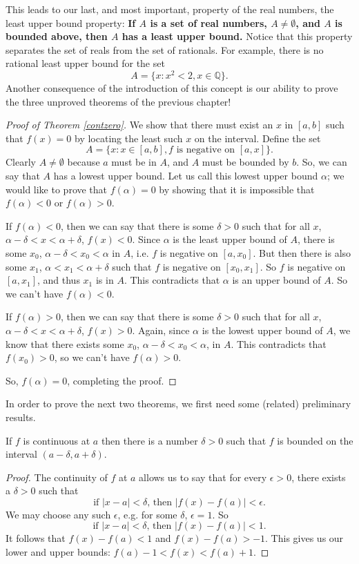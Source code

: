This leads to our last, and most important, property of the real numbers, the least upper bound property: \textbf{If $A$ is a set of real numbers, $A \ne \emptyset$, and $A$ is bounded above, then $A$ has a least upper bound.} Notice that this property separates the set of reals from the set of rationals. For example, there is no rational least upper bound for the set 
\[ A = \{x: x^2 < 2, x \in \mathbb{Q} \}. \]
Another consequence of the introduction of this concept is our ability to prove the three unproved theorems of the previous chapter!

\begin{proof}[Proof of Theorem \ref{contzero}]
We show that there must exist an $x$ in $[a, b]$ such that $f(x) = 0$ by locating the least such $x$ on the interval. Define the set
\[ A = \{x: x \in [a, b], f \textrm{ is negative on } [a, x]\}. \]
Clearly $A \ne \emptyset$ because $a$ must be in $A$, and $A$ must be bounded by $b$. So, we can say that $A$ has a lowest upper bound. Let us call this lowest upper bound $\alpha$; we would like to prove that $f(\alpha) = 0$ by showing that it is impossible that $f(\alpha) < 0$ or $f(\alpha) > 0$.

If $f(\alpha) < 0$, then we can say that there is some $\delta > 0$ such that for all $x$, $\alpha - \delta < x < \alpha + \delta$, $f(x) < 0$. Since $\alpha$ is the least upper bound of $A$, there is some $x_0$, $\alpha - \delta < x_0 < \alpha$ in $A$, i.e. $f$ is negative on $[a, x_0]$. But then there is also some $x_1$, $\alpha < x_1 < \alpha + \delta$ such that $f$ is negative on $[x_0, x_1]$. So $f$ is negative on $[a, x_1]$, and thus $x_1$ is in $A$. This contradicts that $\alpha$ is an upper bound of $A$. So we can't have $f(\alpha) < 0$.

If $f(\alpha) > 0$, then we can say that there is some $\delta > 0$ such that for all $x$, $\alpha - \delta < x < \alpha + \delta$, $f(x) > 0$. Again, since $\alpha$ is the lowest upper bound of $A$, we know that there exists some $x_0$, $\alpha - \delta < x_0 < \alpha$, in $A$. This contradicts that $f(x_0) > 0$, so we can't have $f(\alpha) > 0$.

So, $f(\alpha) = 0$, completing the proof.
\end{proof}

In order to prove the next two theorems, we first need some (related) preliminary results.

\begin{theorem}
If $f$ is continuous at $a$ then there is a number $\delta > 0$ such that $f$ is bounded on the interval $(a - \delta, a + \delta)$.

\begin{proof}
The continuity of $f$ at $a$ allows us to say that for every $\epsilon > 0$, there exists a $\delta > 0$ such that
\[ \textrm{if } |x - a| < \delta \textrm{, then } |f(x) - f(a)| < \epsilon. \]
We may choose any such $\epsilon$, e.g. for some $\delta$, $\epsilon = 1$. So
\[ \textrm{if } |x - a| < \delta \textrm{, then } |f(x) - f(a)| < 1. \]
It follows that $f(x) - f(a) < 1$ and $f(x) - f(a) > -1$. This gives us our lower and upper bounds: $f(a) - 1 < f(x) < f(a) + 1$.
\end{proof}
\end{theorem}

